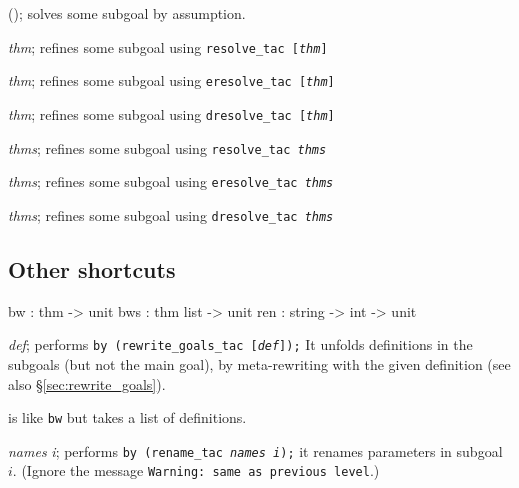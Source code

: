 \begin{ttdescription}
\item[\ttindexbold{fa}();] 
solves some subgoal by assumption.

\item[\ttindexbold{fr} {\it thm};] 
refines some subgoal using \hbox{\tt resolve_tac [{\it thm}]}

\item[\ttindexbold{fe} {\it thm};] 
refines some subgoal using \hbox{\tt eresolve_tac [{\it thm}]}

\item[\ttindexbold{fd} {\it thm};] 
refines some subgoal using \hbox{\tt dresolve_tac [{\it thm}]}

\item[\ttindexbold{frs} {\it thms};] 
refines some subgoal using \hbox{\tt resolve_tac {\it thms}}

\item[\ttindexbold{fes} {\it thms};] 
refines some subgoal using \hbox{\tt eresolve_tac {\it thms}} 

\item[\ttindexbold{fds} {\it thms};] 
refines some subgoal using \hbox{\tt dresolve_tac {\it thms}} 
\end{ttdescription}

\subsection{Other shortcuts}
\begin{ttbox} 
bw  : thm -> unit
bws : thm list -> unit
ren : string -> int -> unit
\end{ttbox}
\begin{ttdescription}
\item[\ttindexbold{bw} {\it def};] performs \hbox{\tt by
    (rewrite_goals_tac [{\it def}]);} It unfolds definitions in the
  subgoals (but not the main goal), by meta-rewriting with the given
  definition (see also \S\ref{sec:rewrite_goals}).

\item[\ttindexbold{bws}] 
is like {\tt bw} but takes a list of definitions.

\item[\ttindexbold{ren} {\it names} {\it i};] 
performs \hbox{\tt by (rename_tac {\it names} {\it i});} it renames
parameters in subgoal~$i$.  (Ignore the message {\footnotesize\tt Warning:\
  same as previous level}.)
\end{ttdescription}


